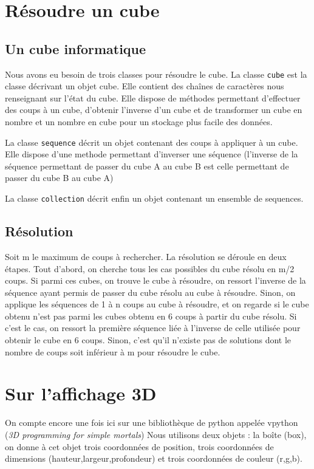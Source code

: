 \documentclass[11pt,a4paper]{article}
\begin{document}
\section{Résoudre un cube}
 	\subsection{Un cube informatique}
    Nous avons eu besoin de trois classes pour résoudre le cube.
La classe \texttt{cube} est la classe décrivant un objet cube. Elle contient des chaînes de caractères nous renseignant
sur l'état du cube. Elle dispose de méthodes permettant d'effectuer des coups à un cube, d'obtenir l'inverse
d'un cube et de transformer un cube en nombre et un nombre en cube pour un stockage plus facile des données.
\par
La classe \texttt{sequence} décrit un objet contenant des coups à appliquer à un cube. Elle dispose d'une methode permettant
d'inverser une séquence (l'inverse de la séquence permettant de passer du cube A au cube B est celle permettant
de passer du cube B au cube A)
\par
La classe \texttt{collection} décrit enfin un objet contenant un ensemble de sequences.
	\subsection{Résolution}
Soit m le maximum de coups à rechercher.
La résolution se déroule en deux étapes. Tout d'abord, on cherche tous les cas possibles du cube résolu en
m/2 coups. Si parmi ces cubes, on trouve le cube à résoudre, on ressort l'inverse de la séquence ayant permis
de passer du cube résolu au cube à résoudre.
Sinon, on applique les séquences de 1 à n coups au cube à résoudre, et on regarde si le cube obtenu n'est
pas parmi les cubes obtenu en 6 coups à partir du cube résolu. Si c'est le cas, on ressort la première séquence
liée à l'inverse de celle utilisée pour obtenir le cube en 6 coups.
Sinon, c'est qu'il n'existe pas de solutions dont le nombre de coups soit inférieur à m pour résoudre le cube.


\section{Sur l'affichage 3D}

On compte encore une fois ici sur une bibliothèque de python appelée vpython (\emph{3D programming for simple mortals})
Nous utilisons deux objets : la boîte (box), on donne à cet objet trois coordonnées de position, trois coordonnées
de dimensions (hauteur,largeur,profondeur) et trois coordonnées de couleur (r,g,b).\\
\end{document}
